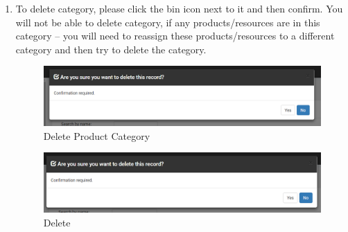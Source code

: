 \documentclass[a4paper,11pt,twoside]{report}
\theoremstyle{definition}
\begin{document}
\begin{enumerate}
\item To delete category, please click the bin icon next to it and then confirm. You will not be able to delete category, if any products/resources are in this category – you will need to reassign these products/resources to a different category and then try to delete the category.

\begin{figure}[h!]
\begin{center}
\includegraphics[width=\textwidth]{AS/categories/product/4}
\end{center}
\caption{Delete Product Category}
\end{figure}

\begin{figure}[h!]
\begin{center}
\includegraphics[width=\textwidth]{AS/categories/resource/4}
\end{center}
\caption{Delete}
\end{figure}

\end{enumerate}
\end{document}
